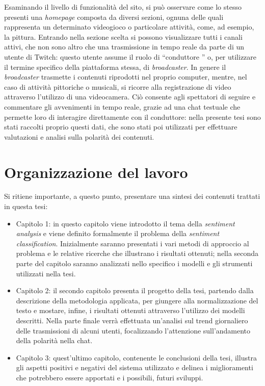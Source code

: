 \documentclass[a4paper,12pt,openright,twoside]{report}
\theoremstyle{definition}
\begin{document}
Esaminando il livello di funzionalità del sito, si può osservare come lo stesso presenti
una \emph{homepage} composta da diversi sezioni, ognuna delle quali rappresenta
un determinato videogioco o particolare attività, come, ad esempio, la pittura.
Entrando nella sezione scelta si possono visualizzare
tutti i canali attivi, che non sono altro che una trasmissione in tempo reale da parte di un 
utente di Twitch: questo utente assume il ruolo di ``conduttore '' o, per utilizzare il termine specifico 
della piattaforma stessa, 
di \emph{broadcaster}. In genere il \emph{broadcaster} trasmette i contenuti riprodotti nel proprio computer,
mentre, nel caso di attività pittoriche o musicali, si ricorre alla registrazione di video 
attraverso l'utilizzo di una videocamera. Ciò consente  agli spettatori di 
seguire e commentare gli avvenimenti in tempo reale, grazie ad una chat testuale che permette 
loro di interagire direttamente con il conduttore: nella presente tesi 
sono stati raccolti proprio questi dati, che sono stati poi utilizzati per effettuare 
valutazioni e analisi sulla polarità dei contenuti.

\section*{Organizzazione del lavoro}
Si ritiene importante, a questo punto, presentare una sintesi dei contenuti trattati in questa tesi:
\begin{itemize}
\item Capitolo 1: in questo capitolo viene introdotto il tema della \emph{sentiment analysis} e
viene definito formalmente il problema della \emph{sentiment classification}. Inizialmente saranno presentati i vari 
metodi di approccio al problema 
e le relative  ricerche
che illustrano i risultati ottenuti; nella seconda
parte del capitolo saranno analizzati nello specifico i modelli e gli strumenti utilizzati nella tesi.
\item Capitolo 2: il secondo capitolo presenta il progetto della tesi,
	partendo dalla descrizione
della metodologia applicata, per giungere alla normalizzazione del testo e mostare, infine,
i risultati ottenuti attraverso l'utilizzo dei modelli descritti.
Nella parte finale verrà effettuata un'analisi sul trend
giornaliero delle trasmissioni di alcuni utenti, focalizzando l'attenzione sull'andamento della polarità nella chat.
\item Capitolo 3: quest'ultimo capitolo, contenente le conclusioni della tesi, illustra
	gli aspetti positivi e negativi
del sistema utilizzato e delinea i miglioramenti che potrebbero essere apportati e i possibili,
futuri sviluppi.
\end{itemize}       %
\end{document}
